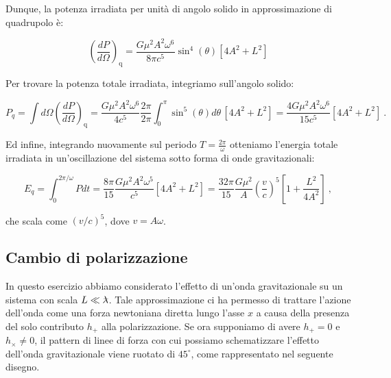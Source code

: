 \documentclass[a4paper,10pt]{article}
\newcommand{\lambdabar}{\lambda\mkern-9mu\raisebox{0.4ex}{–}}
\begin{document}
Dunque, la potenza irradiata per unità di angolo solido in approssimazione di quadrupolo è:

\begin{equation} \label{eq:potenzaperanglosolido}
    \left( \frac{dP}{d\Omega} \right)_{\text{q}} = \frac{G \mu^2 A^2 \omega^6}{8 \pi c^5} \sin^4(\theta) [4A^2 + L^2]
\end{equation}

Per trovare la potenza totale irradiata, integriamo sull'angolo solido:

\begin{equation} \label{eq:potenzatot}
    P_q = \int d\Omega \left( \frac{dP}{d\Omega} \right)_{\text{q}} = \frac{G \mu^2 A^2 \omega^6}{4 c^5} \frac{2\pi}{2\pi} \int_0^\pi \sin^5(\theta) d\theta \, [4A^2 + L^2] = \frac{4 G \mu^2 A^2 \omega^6}{15 c^5} [4A^2 + L^2] \ .
\end{equation}

Ed infine, integrando nuovamente sul periodo $T=\frac{2\pi}{\omega}$ otteniamo l'energia totale irradiata in un'oscillazione del sistema sotto forma di onde gravitazionali:

\begin{equation} \label{eq:energiairradiata}
    E_q = \int_0^{2\pi/\omega} P dt = \frac{8 \pi}{15} \frac{G \mu^2 A^2 \omega^5}{c^5} [4A^2 + L^2] = \frac{32 \pi}{15} \frac{G \mu^2}{A} \left( \frac{v}{c} \right)^5 \left[ 1 + \frac{L^2}{4A^2} \right] \ ,
\end{equation}

che scala come $(v/c)^5$, dove $v = A\omega$.




\subsection{Cambio di polarizzazione}

In questo esercizio abbiamo considerato l'effetto di un'onda gravitazionale su un sistema con scala $L \ll \lambdabar$.
Tale approssimazione ci ha permesso di trattare l'azione dell'onda come una forza newtoniana diretta lungo l'asse $x$ a causa della presenza del solo contributo $h_+$ alla polarizzazione.
Se ora supponiamo di avere $h_+ = 0$ e $h_\times \ne 0$, il pattern di linee di forza con cui possiamo schematizzare l'effetto dell'onda gravitazionale viene ruotato di $45^\circ$, come rappresentato nel seguente disegno. 
\end{document}
